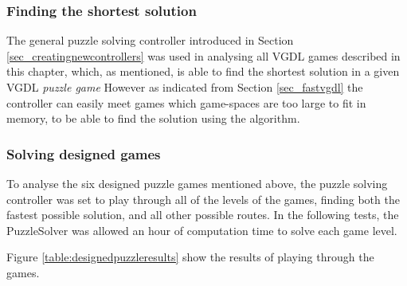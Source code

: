 \documentclass[a4paper,titlepage,final]{report}
\begin{document}

\subsubsection*{Finding the shortest solution}
The general puzzle solving controller introduced in Section \ref{sec_creatingnewcontrollers} was used in analysing all VGDL games described in this chapter, which, as mentioned, is able to find the shortest solution in a given VGDL \textit{puzzle game}
However as indicated from Section \ref{sec_fastvgdl} the controller can easily meet games which game-spaces are too large to fit in memory, to be able to find the solution using the algorithm.



\subsubsection*{Solving designed games}
\label{sec_task3data}
To analyse the six designed puzzle games mentioned above, the puzzle solving controller was set to play through all of the levels of the games, finding both the fastest possible solution, and all other possible routes.
In the following tests, the PuzzleSolver was allowed an hour of computation time to solve each game level.

Figure \ref{table:designedpuzzleresults} show the results of playing through the games.
\end{document}
